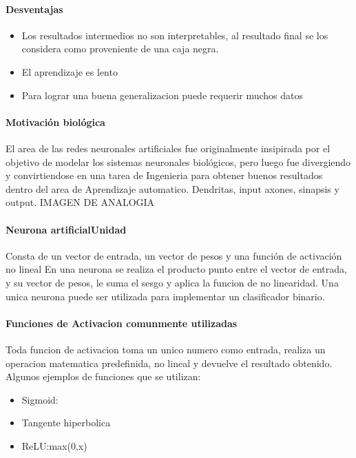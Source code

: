 \documentclass[a4paper,12pt,spanish]{book}
\begin{document}
      \paragraph {Desventajas}
	\begin{itemize}
	  \item Los resultados intermedios no son interpretables, al resultado final se los considera como proveniente de una caja negra.
	  \item El aprendizaje es lento
	  \item Para lograr una buena generalizacion puede requerir muchos datos
	\end{itemize}

      \paragraph {Motivación biológica} 
	El area de las redes neuronales artificiales fue originalmente insipirada por el objetivo de modelar los sistemas neuronales biológicos, 
	pero luego fue divergiendo
	y convirtiendose en una tarea de Ingenieria para obtener buenos resultados dentro del area de Aprendizaje automatico.
	Dendritas, input axones, sinapsis y output.
	IMAGEN DE ANALOGIA

      \paragraph {Neurona artificialUnidad}
	Consta de un vector de entrada, un vector de pesos y una función de activación no lineal
	En una neurona se realiza el producto punto entre el vector de entrada, y su vector de pesos, le suma el sesgo y aplica la funcion de no linearidad.
	Una unica neurona puede ser utilizada para implementar un clasificador binario.

      \paragraph {Funciones de Activacion comunmente utilizadas}
	Toda funcion de activacion toma un unico numero como entrada, realiza un operacion matematica predefinida, no lineal y devuelve el resultado obtenido.
	Algunos ejemplos de funciones que se utilizan:
	\begin{itemize}
	  \item Sigmoid:
	  \item Tangente hiperbolica
	  \item ReLU:max(0,x)
	\end{itemize}
\end{document}
